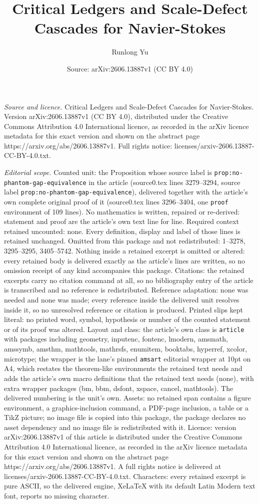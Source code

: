 \documentclass[10pt,a4paper]{amsart}
\title[Critical Ledgers and Scale-Defect Cascades for Navier-Stokes]{Critical Ledgers and Scale-Defect Cascades for Navier-Stokes}
\author{Runlong Yu}
\date{Source: arXiv:2606.13887v1 (CC BY 4.0)}
\begin{document}
\maketitle

\noindent\emph{Source and licence.} Critical Ledgers and Scale-Defect Cascades for Navier-Stokes. Version arXiv:2606.13887v1 (CC BY 4.0), distributed under the Creative Commons Attribution 4.0 International licence, as recorded in the arXiv licence metadata for this exact version and shown on the abstract page https://arxiv.org/abs/2606.13887v1. Full rights notice: licenses/arxiv-2606.13887-CC-BY-4.0.txt.\par\smallskip

\noindent\textit{Editorial scope.} Counted unit: the Proposition whose source label is \texttt{prop:no-phantom-gap-equivalence} in the article (source0.tex lines 3279--3294, source label \texttt{prop:no-phantom-gap-equivalence}), delivered together with the article's own complete original proof of it (source0.tex lines 3296--3404, one \texttt{proof} environment of 109 lines). No mathematics is written, repaired or re-derived: statement and proof are the article's own text line for line. Required context retained uncounted: none. Every definition, display and label of those lines is retained unchanged. Omitted from this package and not redistributed: 1--3278, 3295--3295, 3405--5742. Nothing inside a retained excerpt is omitted or altered: every retained body is delivered exactly as the article's lines are written, so no omission receipt of any kind accompanies this package. Citations: the retained excerpts carry no citation command at all, so no bibliography entry of the article is transcribed and no reference is redistributed. Reference adaptation: none was needed and none was made; every reference inside the delivered unit resolves inside it, so no unresolved reference or citation is produced. Printed slips kept literal: no printed word, symbol, hypothesis or number of the counted statement or of its proof was altered. Layout and class: the article's own class is \texttt{article} with packages including geometry, inputenc, fontenc, lmodern, amsmath, amssymb, amsthm, mathtools, mathrsfs, enumitem, booktabs, hyperref, xcolor, microtype; the wrapper is the lane's pinned \texttt{amsart} editorial wrapper at 10pt on A4, which restates the theorem-like environments the retained text needs and adds the article's own macro definitions that the retained text needs (none), with extra wrapper packages (bm, bbm, dsfont, xspace, cancel, mathtools). The delivered numbering is the unit's own. Assets: no retained span contains a figure environment, a graphics-inclusion command, a PDF-page inclusion, a table or a TikZ picture; no image file is copied into this package, the package declares no asset dependency and no image file is redistributed with it. Licence: version arXiv:2606.13887v1 of this article is distributed under the Creative Commons Attribution 4.0 International licence, as recorded in the arXiv licence metadata for this exact version and shown on the abstract page https://arxiv.org/abs/2606.13887v1. A full rights notice is delivered at licenses/arxiv-2606.13887-CC-BY-4.0.txt. Characters: every retained excerpt is pure ASCII, so the delivered engine, XeLaTeX with its default Latin Modern text font, reports no missing character.
\end{document}
